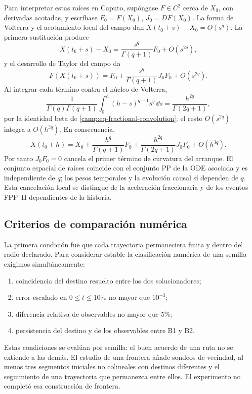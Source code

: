 Para interpretar estas raíces en Caputo, supóngase \(F\in C^2\) cerca de
\(X_0\), con derivadas acotadas, y escríbase \(F_0=F(X_0)\),
\(J_0=DF(X_0)\). La forma de Volterra y el acotamiento local del campo dan
\(X(t_0+s)-X_0=O(s^q)\). La primera sustitución produce
\[
 X(t_0+s)-X_0=\frac{s^q}{\Gamma(q+1)}F_0+O(s^{2q}),
\]
y el desarrollo de Taylor del campo da
\[
 F(X(t_0+s))=F_0+
 \frac{s^q}{\Gamma(q+1)}J_0F_0+O(s^{2q}).
\]
Al integrar cada término contra el núcleo de Volterra,
\[
 \frac1{\Gamma(q)\Gamma(q+1)}
 \int_0^h(h-s)^{q-1}s^q\,\dd s
 =\frac{h^{2q}}{\Gamma(2q+1)},
\]
por la identidad beta de \cref{camp:eq-fractional-convolution}; el resto
\(O(s^{2q})\) integra a \(O(h^{3q})\). En consecuencia,
\begin{equation}
 X(t_0+h)=X_0+
 \frac{h^q}{\Gamma(q+1)}F_0+
 \frac{h^{2q}}{\Gamma(2q+1)}J_0F_0+O(h^{3q}).
 \label{pilot:eq-wu-picard-expansion}
\end{equation}
Por tanto $J_0F_0=0$ cancela el primer término de curvatura del arranque. El
conjunto espacial de raíces coincide con el conjunto PP de la ODE asociada y
es independiente de $q$; los pesos temporales y la evolución causal sí dependen
de $q$. Esta cancelación local se distingue de la aceleración fraccionaria
y de los eventos FPP--H dependientes de la historia.

\subsection{Criterios de comparación numérica}
\label{subsec:pilot-gates}

La primera condición fue que cada trayectoria permaneciera finita y dentro
del radio declarado. Para considerar estable la clasificación numérica de
una semilla exigimos simultáneamente:
\begin{enumerate}
 \item coincidencia del destino resuelto entre los dos solucionadores;
 \item error escalado en $0\le t\le10\tau_*$ no mayor que $10^{-3}$;
 \item diferencia relativa de observables no mayor que $5\%$;
 \item persistencia del destino y de los observables entre B1 y B2.
\end{enumerate}
Estas condiciones se evalúan por semilla: el buen acuerdo de una ruta no se
extiende a las demás. El estudio de una frontera añade sondeos de vecindad,
al menos tres segmentos iniciales no colineales con destinos diferentes y el
seguimiento de una trayectoria que permanezca entre ellos. El experimento
no completó esa construcción de frontera.

